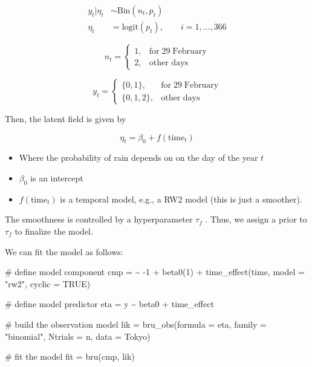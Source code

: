 \documentclass[
  letterpaper,
  DIV=11,
  numbers=noendperiod]{scrartcl}
\newenvironment{Shaded}{\begin{snugshade}}{\end{snugshade}}
\newcommand{\AttributeTok}[1]{\textcolor[rgb]{0.40,0.45,0.13}{#1}}
\newcommand{\CommentTok}[1]{\textcolor[rgb]{0.37,0.37,0.37}{#1}}
\newcommand{\ConstantTok}[1]{\textcolor[rgb]{0.56,0.35,0.01}{#1}}
\newcommand{\DecValTok}[1]{\textcolor[rgb]{0.68,0.00,0.00}{#1}}
\newcommand{\ErrorTok}[1]{\textcolor[rgb]{0.68,0.00,0.00}{#1}}
\newcommand{\FunctionTok}[1]{\textcolor[rgb]{0.28,0.35,0.67}{#1}}
\newcommand{\NormalTok}[1]{\textcolor[rgb]{0.00,0.23,0.31}{#1}}
\newcommand{\OtherTok}[1]{\textcolor[rgb]{0.00,0.23,0.31}{#1}}
\newcommand{\SpecialCharTok}[1]{\textcolor[rgb]{0.37,0.37,0.37}{#1}}
\newcommand{\StringTok}[1]{\textcolor[rgb]{0.13,0.47,0.30}{#1}}
\begin{document}
\[
\begin{aligned}
y_t|\eta_t & \sim\text{Bin}(n_t, p_t) \\
\eta_t &= \text{logit}(p_t),\qquad i = 1,\dots,366
\end{aligned}
\]

\[
n_t = \left\{
 \begin{array}{lr}
1, & \text{for}\; 29\; \text{February}\\
2, & \text{other days}
\end{array}\right.
\]

\[
y_t =
\begin{cases}
\{0,1\}, & \text{for}\; 29\; \text{February}\\
\{0,1,2\}, & \text{other days}
 \end{cases}
\]

Then, the latent field is given by

\[
\eta_t = \beta_0 + f(\text{time}_t)
\]

\begin{itemize}
\item
  Where the probability of rain depends on on the day of the year \(t\)
\item
  \(\beta_0\) is an intercept
\item
  \(f(\text{time}_t)\) is a temporal model, e.g., a RW2 model (this is
  just a smoother).
\end{itemize}

The smoothness is controlled by a hyperparameter \(\tau_f\) . Thus, we
assign a prior to \(\tau_f\) to finalize the model.

We can fit the model as follows:

\begin{Shaded}
\begin{Highlighting}[]
\CommentTok{\# define model component}
\NormalTok{cmp }\OtherTok{=}  \ErrorTok{\textasciitilde{}} \SpecialCharTok{{-}}\DecValTok{1} \SpecialCharTok{+} \FunctionTok{beta0}\NormalTok{(}\DecValTok{1}\NormalTok{) }\SpecialCharTok{+} \FunctionTok{time\_effect}\NormalTok{(time, }\AttributeTok{model =} \StringTok{"rw2"}\NormalTok{, }\AttributeTok{cyclic =} \ConstantTok{TRUE}\NormalTok{)}

\CommentTok{\# define model predictor}
\NormalTok{eta }\OtherTok{=}\NormalTok{ y }\SpecialCharTok{\textasciitilde{}}\NormalTok{ beta0 }\SpecialCharTok{+}\NormalTok{ time\_effect}

\CommentTok{\# build the observation model}
\NormalTok{lik }\OtherTok{=} \FunctionTok{bru\_obs}\NormalTok{(}\AttributeTok{formula =}\NormalTok{ eta,}
              \AttributeTok{family =} \StringTok{"binomial"}\NormalTok{,}
              \AttributeTok{Ntrials =}\NormalTok{ n,}
              \AttributeTok{data =}\NormalTok{ Tokyo)}

\CommentTok{\# fit the model}
\NormalTok{fit }\OtherTok{=} \FunctionTok{bru}\NormalTok{(cmp, lik)}
\end{Highlighting}
\end{Shaded}
\end{document}

